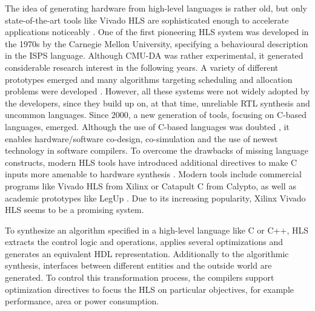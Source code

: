 The idea of generating hardware from high-level languages is rather old, but
only state-of-the-art tools like Vivado HLS are sophisticated enough to
accelerate applications noticeably \citep{EcEc08,XSA10}. One of the first
pioneering \ac{HLS} system was developed in the 1970s \citep{DPS81} by the
Carnegie Mellon University, specifying a behavioural description in the
\ac{ISPS} language. Although \ac{CMU-DA} was rather experimental, it generated
considerable research interest in the following years. A variety of different
prototypes emerged and many algorithms targeting scheduling and allocation
problems were developed \citep{CBN11}. However, all these systems were not
widely adopted by the developers, since they build up on, at that time,
unreliable \ac{RTL} synthesis and uncommon languages. Since 2000, a new
generation of tools, focusing on C-based languages, emerged. Although the use
of C-based languages was doubted \citep{Edw06}, it enables hardware/software
co-design, co-simulation and the use of newest technology in software
compilers. To overcome the drawbacks of missing language constructs, modern
\ac{HLS} tools have introduced additional directives to make C inputs more
amenable to hardware synthesis \citep{CBN11}. Modern tools include commercial
programs like Vivado HLS from Xilinx or Catapult C from Calypto, as well as
academic prototypes like LegUp \citep{CCA11}. Due to its increasing
popularity, Xilinx Vivado HLS seems to be a promising system.

To synthesize an algorithm specified in a high-level language like C or C++,
\ac{HLS} extracts the control logic and operations, applies several
optimizations and generates an equivalent \ac{HDL} representation.
Additionally to the algorithmic synthesis, interfaces between different
entities and the outside world are generated. To control this transformation
process, the compilers support optimization directives to focus the \ac{HLS}
on particular objectives, for example performance, area or power consumption.%

